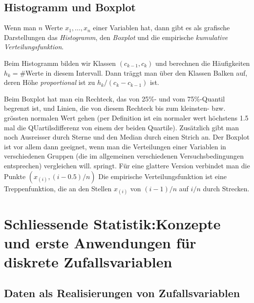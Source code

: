 \section{Histogramm und Boxplot}
Wenn man $n$ Werte $x_1,\ldots,x_n$ einer Variablen hat, dann gibt es als grafische Darstellungen das \emph{Histogramm}, den \emph{Boxplot} und die empirische \emph{kumulative Verteilungsfunktion}. 

Beim Histogramm bilden wir Klassen $(c_{k-1},c_k)$ und berechnen die Häufigkeiten $h_k=$\#Werte in diesem Intervall. Dann träggt man über den Klassen Balken auf, deren Höhe \emph{proportional} ist zu $h_k/(c_k-c_{k-1})$ ist.

Beim Boxplot hat man ein Rechteck, das von 25\%- und vom 75\%-Quantil begrenzt ist, und Linien, die von diesem Rechteck bis zum kleinsten- bzw. grössten \glqq normalen \grqq Wert gehen (per Definition ist ein normaler wert höchstens 1.5 mal die QUartilsdifferenz von einem der beiden Quartile). Zusätzlich gibt man noch Ausreisser durch Sterne und den Median durch einen Strich an. Der Boxplot ist vor allem dann geeignet, wenn man die Verteilungen einer Variablen in verschiedenen Gruppen (die im allgemeinen verschiedenen Versuchsbedingungen entsprechen) vergleichen will.
springt. Für eine glattere Version verbindet man die Punkte $(x_{(i)},(i-0.5)/n)$
Die empirische Verteilungsfunktion ist eine Treppenfunktion, die an den Stellen $x_{(i)}$ von $(i-1)/n$ auf $i/n$ durch Strecken.
\chapter{Schliessende Statistik:Konzepte und erste Anwendungen für diskrete Zufallsvariablen}
\section{Daten als Realisierungen von Zufallsvariablen}
\label{sec8.1}

